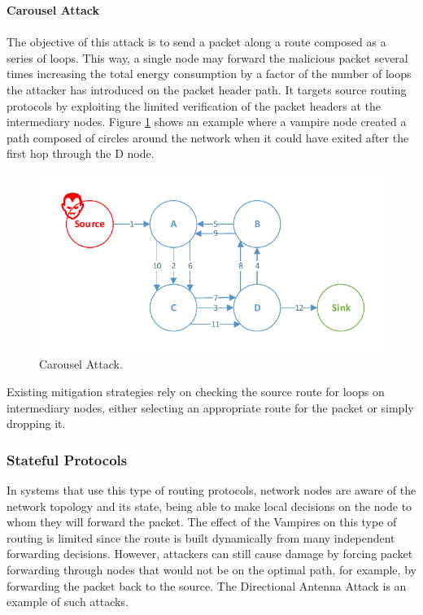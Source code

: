 \documentclass{sig-alternate-05-2015}
\begin{document}
\textbf{Carousel Attack}\\\\
The objective of this attack is to send a packet along a route composed as a series of loops. This way, a single node may forward the malicious packet several times increasing the total energy consumption by a factor of the number of loops the attacker has introduced on the packet header path. It targets source routing protocols by exploiting the limited verification of the packet headers at the intermediary nodes. Figure \ref{fig:carousel_attack} shows an example where a vampire node created a path composed of circles around the network when it could have exited after the first hop through the D node.
 
\begin{figure}[h]
  \centering
  \includegraphics[width=0.9\linewidth]{figures/Carousel_Attack.pdf}
  \caption{Carousel Attack.}
  \label{fig:carousel_attack}
\end{figure}

Existing mitigation strategies rely on checking the source route for loops on intermediary nodes, either selecting an appropriate route for the packet or simply dropping it.

\subsubsection{Stateful Protocols}
\label{sec:tables_routing}
In systems that use this type of routing protocols, network nodes are aware of the network topology and its state, being able to make local decisions on the node to whom they will forward the packet. The effect of the Vampires on this type of routing is limited since the route is built dynamically from many independent forwarding decisions. However, attackers can still cause damage by forcing packet forwarding through nodes that would not be on the optimal path, for example, by forwarding the packet back to the source. The Directional Antenna Attack is an example of such attacks.\\
\end{document}
